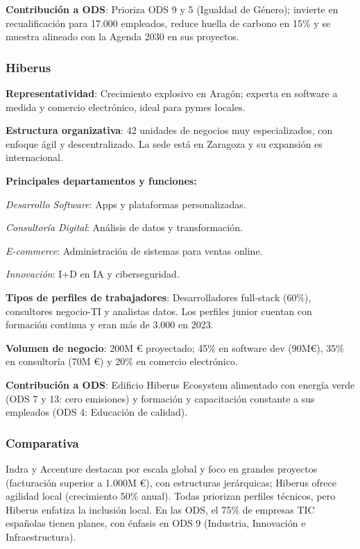 \documentclass[11.5pt]{article}
\begin{document}
	\textbf{Contribución a ODS}: Prioriza ODS 9 y 5 (Igualdad de Género); invierte en recualificación para 17.000
	empleados, reduce huella de carbono en 15\% y se muestra alineado con la Agenda 2030 en sus proyectos.
	
	\subsubsection{Hiberus}
	
	\textbf{Representatividad}: Crecimiento explosivo en Aragón; experta en software a medida y comercio electrónico,
	ideal para pymes locales.
	
	\textbf{Estructura organizativa}: 42 unidades de negocios muy especializados, con enfoque ágil y descentralizado.
	La sede está en Zaragoza y su expansión es internacional.
	
	\textbf{Principales departamentos y funciones:}
	
	\textit{Desarrollo Software}: Apps y plataformas personalizadas.
	
	\textit{Consultoría Digital}: Análisis de datos y transformación.
	
	\textit{E-commerce}: Administración de sistemas para ventas online.
	
	\textit{Innovación}: I+D en IA y ciberseguridad.
	
	\textbf{Tipos de perfiles de trabajadores}: Desarrolladores full-stack (60\%), consultores negocio-TI y analistas
	datos. Los perfiles junior cuentan con formación continua y eran más de 3.000 en 2023.
	
	\textbf{Volumen de negocio}: 200M € proyectado; 45\% en software dev (90M€), 35\% en consultoría (70M €) y 20\%
	en comercio electrónico.
	
	\textbf{Contribución a ODS}: Edificio Hiberus Ecosystem alimentado con energía verde (ODS 7 y 13: cero emisiones) y formación y capacitación constante a sus empleados (ODS 4: Educación de calidad).
	
	\subsubsection{Comparativa}
	
	Indra y Accenture destacan por escala global y foco en grandes proyectos (facturación superior a 1.000M €),
	con estructuras jerárquicas; Hiberus ofrece agilidad local (crecimiento 50\% anual). Todas priorizan perfiles técnicos, pero Hiberus enfatiza la inclusión local. En las ODS, el 75\% de empresas TIC españolas tienen planes, con énfasis en ODS 9 (Industria, Innovación e Infraestructura).
	
\end{document}
